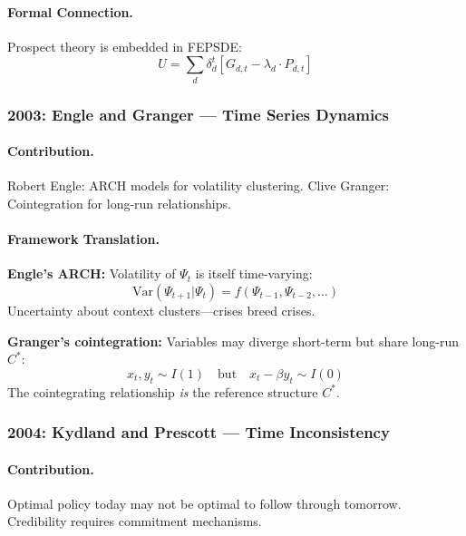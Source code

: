\documentclass[12pt,a4paper]{article}
\begin{document}
\paragraph{Formal Connection.}
Prospect theory is embedded in FEPSDE:
\begin{equation}
  U = \sum_d \delta_d^t [G_{d,t} - \lambda_d \cdot P_{d,t}]
\end{equation}

\subsubsection{2003: Engle and Granger --- Time Series Dynamics}

\paragraph{Contribution.}
Robert Engle: ARCH models for volatility clustering.
Clive Granger: Cointegration for long-run relationships.

\paragraph{Framework Translation.}
\textbf{Engle's ARCH:} Volatility of $\Psi_t$ is itself time-varying:
\begin{equation}
  \text{Var}(\Psi_{t+1} | \Psi_t) = f(\Psi_{t-1}, \Psi_{t-2}, \ldots)
\end{equation}
Uncertainty about context clusters---crises breed crises.

\textbf{Granger's cointegration:} Variables may diverge short-term but share long-run $C^*$:
\begin{equation}
  x_t, y_t \sim I(1) \quad \text{but} \quad x_t - \beta y_t \sim I(0)
\end{equation}
The cointegrating relationship \emph{is} the reference structure $C^*$.

\subsubsection{2004: Kydland and Prescott --- Time Inconsistency}

\paragraph{Contribution.}
Optimal policy today may not be optimal to follow through tomorrow.
Credibility requires commitment mechanisms.
\end{document}
